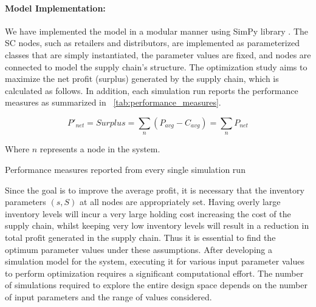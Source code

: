 \paragraph{Model Implementation:}
We have implemented the model in a modular manner using SimPy library \cite{SimPy}. The SC nodes, such as retailers and distributors, are implemented as parameterized classes that are simply instantiated, the parameter values are fixed, and nodes are connected to model the supply chain's structure. The optimization study aims to maximize the net profit (surplus) generated by the supply chain, which is calculated as follows. In addition, each simulation run reports the performance measures as summarized in \tablename~\ref{tab:performance_measures}.


$$P'_{net} =Surplus=\sum_n{(P_{avg} - C_{avg})} = \sum_n{P_{net}}$$

Where $n$ represents a node in the system.
\begin{table}[]\fontsize{9pt}{10pt}\selectfont
\caption{Performance measures reported from every single simulation run}\label{tab:performance_measures} \centering

\end{table}
Since the goal is to improve the average profit, it is necessary that the inventory parameters $(s, S)$ at all nodes are appropriately set. Having overly large inventory levels will incur a very large holding cost increasing the cost of the supply chain, whilst keeping very low inventory levels will result in a reduction in total profit generated in the supply chain. Thus it is essential to find the optimum parameter values under these assumptions. 
After developing a simulation model for the system, executing it for various input parameter values to perform optimization requires a significant computational effort. The number of simulations required to explore the entire design space depends on the number of input parameters and the range of values considered.
